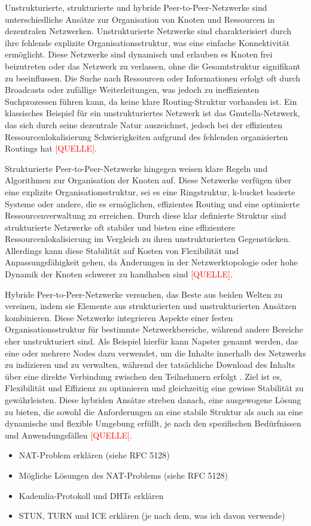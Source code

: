 \noindent Unstrukturierte, strukturierte und hybride Peer-to-Peer-Netzwerke sind unterschiedliche Ansätze zur Organisation von Knoten und Ressourcen in dezentralen Netzwerken. Unstrukturierte Netzwerke sind charakterisiert durch ihre fehlende explizite Organisationsstruktur, was eine einfache Konnektivität ermöglicht. Diese Netzwerke sind dynamisch und erlauben es Knoten frei beizutreten oder das Netzwerk zu verlassen, ohne die Gesamtstruktur signifikant zu beeinflussen. Die Suche nach Ressourcen oder Informationen erfolgt oft durch Broadcasts oder zufällige Weiterleitungen, was jedoch zu ineffizienten Suchprozessen führen kann, da keine klare Routing-Struktur vorhanden ist. Ein klassisches Beispiel für ein unstrukturiertes Netzwerk ist das Gnutella-Netzwerk, das sich durch seine dezentrale Natur auszeichnet, jedoch bei der effizienten Ressourcenlokalisierung Schwierigkeiten aufgrund des fehlenden organisierten Routings hat \textcolor{red}{[QUELLE]}.

Strukturierte Peer-to-Peer-Netzwerke hingegen weisen klare Regeln und Algorithmen zur Organisation der Knoten auf. Diese Netzwerke verfügen über eine explizite Organisationsstruktur, sei es eine Ringstruktur, k-bucket basierte Systeme oder andere, die es ermöglichen, effizientes Routing und eine optimierte Ressourcenverwaltung zu erreichen. Durch diese klar definierte Struktur sind strukturierte Netzwerke oft stabiler und bieten eine effizientere Ressourcenlokalisierung im Vergleich zu ihren unstrukturierten Gegenstücken. Allerdings kann diese Stabilität auf Kosten von Flexibilität und Anpassungsfähigkeit gehen, da Änderungen in der Netzwerktopologie oder hohe Dynamik der Knoten schwerer zu handhaben sind \textcolor{red}{[QUELLE]}.

Hybride Peer-to-Peer-Netzwerke versuchen, das Beste aus beiden Welten zu vereinen, indem sie Elemente aus strukturierten und unstrukturierten Ansätzen kombinieren. Diese Netzwerke integrieren Aspekte einer festen Organisationsstruktur für bestimmte Netzwerkbereiche, während andere Bereiche eher unstrukturiert sind. Als Beispiel hierfür kann Napster genannt werden, das eine oder mehrere Nodes dazu verwendet, um die Inhalte innerhalb des Netzwerks zu indizieren und zu verwalten, während der tatsächliche Download des Inhalts über eine direkte Verbindung zwischen den Teilnehmern erfolgt \parencite{Yang_ComparingHybridP2PSystems}.
Ziel ist es, Flexibilität und Effizienz zu optimieren und gleichzeitig eine gewisse Stabilität zu gewährleisten. Diese hybriden Ansätze streben danach, eine ausgewogene Lösung zu bieten, die sowohl die Anforderungen an eine stabile Struktur als auch an eine dynamische und flexible Umgebung erfüllt, je nach den spezifischen Bedürfnissen und Anwendungsfällen \textcolor{red}{[QUELLE]}.





\begin{itemize}
    \item NAT-Problem erklären (siehe RFC 5128)
    \item Mögliche Lösungen des NAT-Problems (siehe RFC 5128)
    \item Kademlia-Protokoll und DHTs erklären
    \item STUN, TURN und ICE erklären (je nach dem, was ich davon verwende)
\end{itemize}